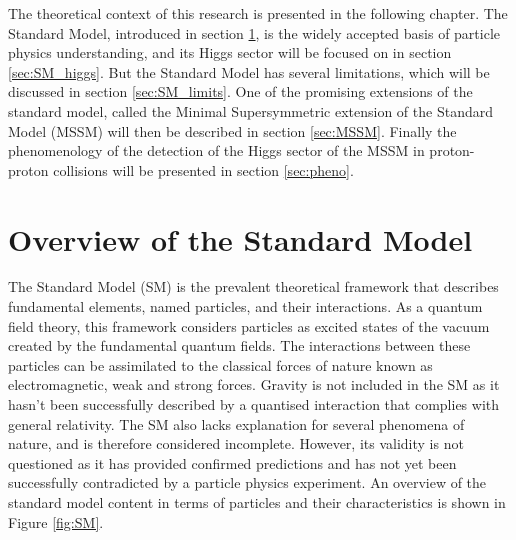 




The theoretical context of this research is presented in the following chapter. The Standard Model, introduced in section \ref{sec:SM}, is the widely accepted basis of particle physics understanding, and its Higgs sector will be focused on in section \ref{sec:SM_higgs}. But the Standard Model has several limitations, which will be discussed in section \ref{sec:SM_limits}. One of the promising extensions of the standard model, called the Minimal Supersymmetric extension of the Standard Model (MSSM) will then be described in section \ref{sec:MSSM}. Finally the phenomenology of the detection of the Higgs sector of the MSSM in proton-proton collisions will be presented in section \ref{sec:pheno}.

\section{Overview of the Standard Model}
\label{sec:SM}
The Standard Model (SM) is the prevalent theoretical framework that describes fundamental elements, named particles, and their interactions. As a quantum field theory, this framework considers particles as excited states of the vacuum created by the fundamental quantum fields. The interactions between these particles can be assimilated to the classical forces of nature known as electromagnetic, weak and strong forces. Gravity is not included in the SM as it hasn't been successfully described by a quantised interaction that complies with general relativity. The SM also lacks explanation for several phenomena of nature, and is therefore considered incomplete. However, its validity is not questioned as it has provided confirmed predictions and has not yet been successfully contradicted by a particle physics experiment. An overview of the standard model content in terms of particles and their characteristics is shown in Figure \ref{fig:SM}.\newline

